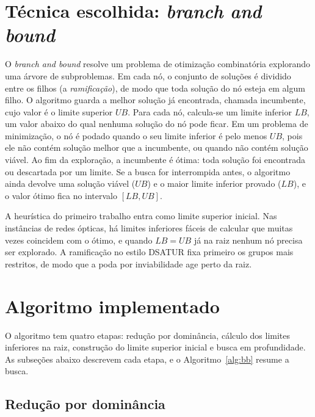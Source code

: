 \documentclass[12pt]{article}
\newcommand{\LB}{\mathit{LB}}
\newcommand{\UB}{\mathit{UB}}
\begin{document}
\section{Técnica escolhida: \emph{branch and bound}}\label{sec:tecnica}

O \emph{branch and bound} \cite{landdoig1960} resolve um problema de
otimização combinatória explorando uma árvore de subproblemas. Em cada nó, o
conjunto de soluções é dividido entre os filhos (a \emph{ramificação}), de
modo que toda solução do nó esteja em algum filho. O algoritmo guarda a melhor
solução já encontrada, chamada incumbente, cujo valor é o limite superior
$\UB$. Para cada nó, calcula-se um limite inferior $\LB$, um valor abaixo do
qual nenhuma solução do nó pode ficar. Em um problema de minimização, o nó é
podado quando o seu limite inferior é pelo menos $\UB$, pois ele não contém
solução melhor que a incumbente, ou quando não contém solução viável. Ao fim
da exploração, a incumbente é ótima: toda solução foi encontrada ou
descartada por um limite. Se a busca for interrompida antes,
o algoritmo ainda devolve uma solução viável ($\UB$) e o maior limite
inferior provado ($\LB$), e o valor ótimo fica no intervalo $[\LB,\UB]$.

A heurística do primeiro trabalho entra como limite superior inicial. Nas
instâncias de redes ópticas, há limites inferiores fáceis de calcular que
muitas vezes coincidem com o ótimo, e quando $\LB=\UB$ já na raiz nenhum nó
precisa ser explorado. A ramificação no estilo DSATUR fixa primeiro os grupos
mais restritos, de modo que a poda por inviabilidade age perto da raiz.

\section{Algoritmo implementado}\label{sec:algoritmo}

O algoritmo tem quatro etapas: redução por dominância, cálculo dos limites
inferiores na raiz, construção do limite superior inicial e busca em
profundidade. As subseções abaixo descrevem cada etapa, e o
Algoritmo~\ref{alg:bb} resume a busca.

\subsection{Redução por dominância}
\end{document}
